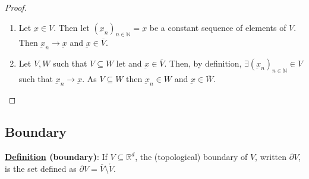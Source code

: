 \documentclass[10pt]{extarticle}
\newcommand{\R}{\mathbb{R}}
\newcommand{\N}{\mathbb{N}}
\newcommand{\munderbar}[1]{\underbar{\ensuremath{#1}}}
\newcommand{\skiplineafterproof}{$ $\par\nobreak\ignorespaces}
\begin{document}
\begin{proof}
    \skiplineafterproof
    \begin{enumerate}
        \item Let $\munderbar{x} \in V$.
              Then let $\left(\munderbar{x}_n\right)_{n \in \N} = \munderbar{x}$ be a constant sequence of elements of $V$.
              Then $\munderbar{x}_n \to \munderbar{x}$ and $\munderbar{x} \in \overline{V}$.
        \item Let $V, W$ such that $V \subseteq W$ let and $\munderbar{x} \in \overline{V}$.
              Then, by definition, $\exists \left(\munderbar{x}_n\right)_{n \in \N} \in V$ such that $\munderbar{x}_n \to \munderbar{x}$.
              As $V \subseteq W$ then $\munderbar{x}_n \in W$ and $\munderbar{x} \in \overline{W}$.
    \end{enumerate}
\end{proof}

\subsection{Boundary}

\textbf{\underline{Definition} (boundary)}:
If $V \subseteq \R^d$, the (topological) boundary of $V$, written $\partial V$, is the set defined as $\partial V = \overline{V} \setminus \mathring{V}$.
\end{document}
